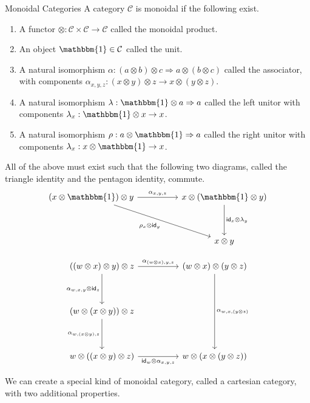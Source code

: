 \documentclass[12pt]{article}
\begin{document}
\begin{definition}{Monoidal Categories}{}
    A category $\mathcal{C}$ is monoidal if the following exist.
    \begin{enumerate}
        \item A functor $\otimes:\mathcal{C}\times\mathcal{C}\rightarrow\mathcal{C}$ called the monoidal product.
        \item An object $\mathbbm{1}\in\mathcal{C}$ called the unit.
        \item A natural isomorphism $\alpha : (a\otimes b)\otimes c\Rightarrow a\otimes (b\otimes c)$ called the associator, with components $\alpha_{x,y,z}: (x\otimes y)\otimes z\rightarrow x\otimes (y\otimes z)$.
        \item A natural isomorphism $\lambda : \mathbbm{1}\otimes a\Rightarrow a$ called the left unitor with components $\lambda_x : \mathbbm{1}\otimes x\rightarrow x$.
        \item A natural isomorphism $\rho : a\otimes \mathbbm{1}\Rightarrow a$ called the right unitor with components $\lambda_x : x\otimes \mathbbm{1}\rightarrow x$.
    \end{enumerate}
    All of the above must exist such that the following two diagrams, called the triangle identity and the pentagon identity, commute.
    \[\begin{tikzcd}
            {(x\otimes\mathbbm{1})\otimes y} && {x\otimes(\mathbbm{1}\otimes y)} \\
            \\
            && {x\otimes y}
            \arrow["{{\rho_x\otimes \mathsf{id}_y}}"', from=1-1, to=3-3]
            \arrow["{{\mathsf{id}_x\otimes\lambda_y}}", from=1-3, to=3-3]
            \arrow["{{\alpha_{x,y,z}}}", from=1-1, to=1-3]
        \end{tikzcd}\]
\end{definition}
\begin{definition*}{}{}
    \[\begin{tikzcd}
            {((w\otimes x)\otimes y)\otimes z} && {(w\otimes x)\otimes(y\otimes z)} \\
            \\
            {(w\otimes (x\otimes y))\otimes z} \\
            \\
            {w\otimes ((x\otimes y)\otimes z)} && {w\otimes (x\otimes (y\otimes z))}
            \arrow["{{\alpha_{w,x,(y\otimes z)}}}", from=1-3, to=5-3]
            \arrow["{{\alpha_{(w\otimes x),y,z}}}", from=1-1, to=1-3]
            \arrow["{{\alpha_{w,x,y}\otimes \mathsf{id}_z}}"', from=1-1, to=3-1]
            \arrow["{{\alpha_{w,(x\otimes y),z}}}"', from=3-1, to=5-1]
            \arrow["{{\mathsf{id}_w\otimes \alpha_{x,y,z}}}"', from=5-1, to=5-3]
        \end{tikzcd}\]
\end{definition*}
We can create a special kind of monoidal category, called a cartesian category, with two additional properties.
\end{document}

